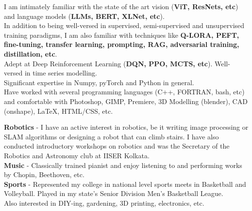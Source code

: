 \documentclass[10pt,a4paper]{article}
\begin{document}
	  I am intimately familiar with the state of the art vision (\textbf{ViT, ResNets, etc}) and language models (\textbf{LLMs, BERT, XLNet, etc}).\\
	  In addition to being well-versed in supervised, semi-supervised and unsupervised training paradigms, I am also familiar with techniques like \textbf{Q-LORA, PEFT, fine-tuning, transfer learning, prompting, RAG, adversarial training, distillation, etc}.\\
	  Adept at Deep Reinforcement Learning (\textbf{DQN, PPO, MCTS, etc}). Well-versed in time series modelling. \\
	  Significant expertise in Numpy, pyTorch and Python in general.\\
	  Have worked with several programming languages (C++, FORTRAN, bash, etc) and comfortable with Photoshop, GIMP, Premiere, 3D Modelling (blender), CAD (onshape), \LaTeX, HTML/CSS, etc.

\spacedhrule{1.6em}{-0.4em}
	  \textbf{Robotics} - I have an active interest in robotics, be it writing image processing or SLAM algorithms or designing a robot that can climb stairs. I have also conducted introductory workshops on robotics and was the Secretary of the Robotics and Astronomy club at IISER Kolkata.\\
	  \textbf{Music} - Classically trained pianist and enjoy listening to and performing works by Chopin, Beethoven, etc.\\
	  \textbf{Sports} - Represented my college in national level sports meets in Basketball and Volleyball. Played in my state's Senior Division Men's Basketball League.\\
	  Also interested in DIY-ing, gardening, 3D printing, electronics, etc.\\

\spacedhrule{1.6em}{-0.4em}
\end{document}
